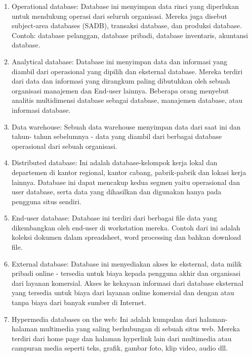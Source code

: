 \begin{enumerate}
\item Operational database: Database ini menyimpan data rinci yang diperlukan untuk mendukung operasi dari seluruh organisasi. Mereka juga disebut subject-area databases (SADB), transaksi database, dan produksi database. Contoh: database pelanggan, database pribadi, database inventaris, akuntansi database. \par
\noindent 
\item Analytical database: Database ini menyimpan data dan informasi yang diambil dari operasional yang dipilih dan eksternal database. Mereka terdiri dari data dan informasi yang dirangkum paling dibutuhkan oleh sebuah organisasi manajemen dan End-user lainnya. Beberapa orang menyebut analitis multidimensi database sebagai database, manajemen database, atau informasi database. \par
\noindent 
\item Data warehouse: Sebuah data warehouse menyimpan data dari saat ini dan tahun- tahun sebelumnya - data yang diambil dari berbagai database operasional dari sebuah organisasi. \par
\noindent 
\item Distributed database: Ini adalah database-kelompok kerja lokal dan departemen di kantor regional, kantor cabang, pabrik-pabrik dan lokasi kerja lainnya. Database ini dapat mencakup kedua segmen yaitu operasional dan user database, serta data yang dihasilkan dan digunakan hanya pada pengguna situs sendiri. \par
\noindent 
\item End-user database: Database ini terdiri dari berbagai file data yang dikembangkan oleh end-user di workstation mereka. Contoh dari ini adalah koleksi dokumen dalam spreadsheet, word processing dan bahkan download file. \par
\noindent 
\item External database: Database ini menyediakan akses ke eksternal, data milik pribadi online - tersedia untuk biaya kepada pengguna akhir dan organisasi dari layanan komersial. Akses ke kekayaan informasi dari database eksternal yang tersedia untuk biaya dari layanan online komersial dan dengan atau tanpa biaya dari banyak sumber di Internet. \par
\noindent 
\item Hypermedia databases on the web: Ini adalah kumpulan dari halaman-halaman multimedia yang saling berhubungan di sebuah situs web. Mereka terdiri dari home page dan halaman hyperlink lain dari multimedia atau campuran media seperti teks, grafik, gambar foto, klip video, audio dll. \par

\end{enumerate}
